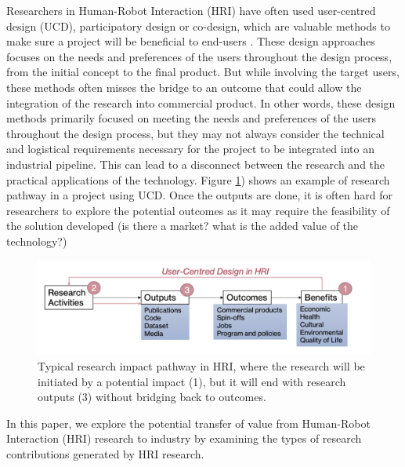 \documentclass[letterpaper]{article} %
\begin{document}
Researchers in Human-Robot Interaction (HRI) have often used user-centred design (UCD), participatory design or co-design, which are valuable methods to make sure a project will be beneficial to end-users \cite{Lupetti}. These design approaches focuses on the needs and preferences of the users throughout the design process, from the initial concept to the final product.
But while involving the target users, these methods often misses the bridge to an outcome that could allow the integration of the research into commercial product.
In other words, these design methods primarily focused on meeting the needs and preferences of the users throughout the design process, but they may not always consider the technical and logistical requirements necessary for the project to be integrated into an industrial pipeline. This can lead to a disconnect between the research and the practical applications of the technology.
Figure \ref{fig:pipleine}) shows an example of research pathway in a project using UCD.  Once the outputs are done, it is often hard for researchers to explore the potential outcomes as it may require the feasibility of the solution developed (is there a market? what is the added value of the technology?)
\begin{figure}[h]
    \centering
    \includegraphics[width=\linewidth]{RIpathwayHRI.png}
    \caption{Typical research impact pathway in HRI, where the research will be initiated by a potential impact (1), but it will end with research outputs (3) without bridging back to outcomes.}
    \label{fig:pipleine}
\end{figure}

In this paper, we explore the potential transfer of value from Human-Robot Interaction (HRI) research to industry by examining the types of research contributions generated by HRI research.
\end{document}
